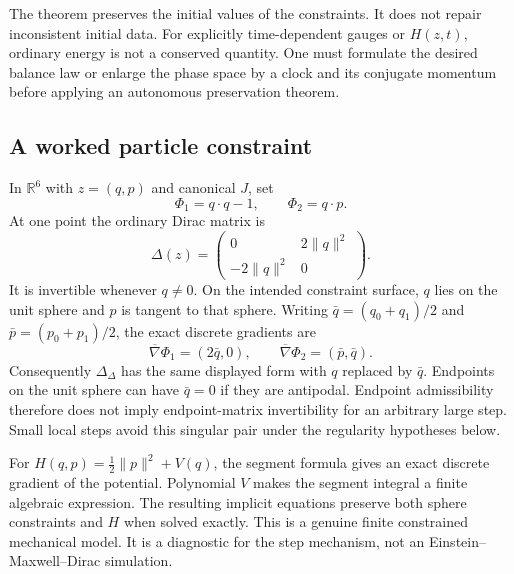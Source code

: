 The theorem preserves the initial values of the constraints. It does not repair inconsistent initial data. For explicitly time-dependent gauges or $H(z,t)$, ordinary energy is not a conserved quantity. One must formulate the desired balance law or enlarge the phase space by a clock and its conjugate momentum before applying an autonomous preservation theorem.

\subsection{A worked particle constraint}
In $\mathbb R^6$ with $z=(q,p)$ and canonical $J$, set
\begin{equation}
 \Phi_1=q\cdot q-1,\qquad \Phi_2=q\cdot p.
\end{equation}
At one point the ordinary Dirac matrix is
\begin{equation}
 \Delta(z)=\begin{pmatrix}0&2\|q\|^2\\-2\|q\|^2&0\end{pmatrix}.
\end{equation}
It is invertible whenever $q\ne0$. On the intended constraint surface, $q$ lies on the unit sphere and $p$ is tangent to that sphere.
Writing $\bar q=(q_0+q_1)/2$ and $\bar p=(p_0+p_1)/2$, the exact discrete gradients are
\begin{equation}
 \overline\nabla\Phi_1=(2\bar q,0),\qquad
 \overline\nabla\Phi_2=(\bar p,\bar q).
\end{equation}
Consequently $\Delta_\Delta$ has the same displayed form with $q$ replaced by $\bar q$. Endpoints on the unit sphere can have $\bar q=0$ if they are antipodal. Endpoint admissibility therefore does not imply endpoint-matrix invertibility for an arbitrary large step. Small local steps avoid this singular pair under the regularity hypotheses below.

For $H(q,p)=\tfrac12\|p\|^2+V(q)$, the segment formula gives an exact discrete gradient of the potential. Polynomial $V$ makes the segment integral a finite algebraic expression. The resulting implicit equations preserve both sphere constraints and $H$ when solved exactly. This is a genuine finite constrained mechanical model. It is a diagnostic for the step mechanism, not an Einstein--Maxwell--Dirac simulation.


